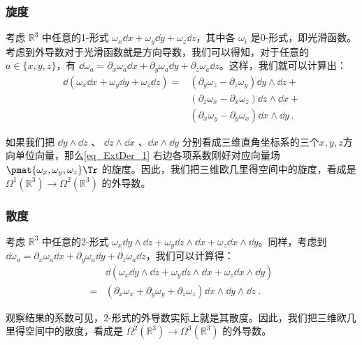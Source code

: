 \subsubsection{旋度}

考虑 $\mathbb{R}^3$ 中任意的1-形式 $\omega_x\dd x+\omega_y\dd y+\omega_z\dd z$，其中各 $\omega_i$ 是0-形式，即光滑函数。考虑到外导数对于光滑函数就是方向导数，我们可以得知，对于任意的 $a\in\{x,y,z\}$，有 $\dd\omega_a=\partial_x\omega_a\dd x+\partial_y\omega_a\dd y+\partial_z\omega_a\dd z$。这样，我们就可以计算出：
\begin{equation}\label{eq_ExtDer_1}
\begin{aligned}
\dd(\omega_x\dd x+\omega_y\dd y+\omega_z\dd z)={}&(\partial_y\omega_z-\partial_z\omega_y)\dd y\wedge\dd z+\\&(\partial_z\omega_x-\partial_x\omega_z)\dd z\wedge\dd x+\\&(\partial_x\omega_y-\partial_y\omega_x)\dd x\wedge\dd y~.
\end{aligned}
\end{equation}

如果我们把 $\dd y\wedge\dd z$ 、 $\dd z\wedge\dd x$ 、$\dd x\wedge\dd y$ 分别看成三维直角坐标系的三个$x, y, z$方向单位向量，那么\autoref{eq_ExtDer_1} 右边各项系数刚好对应向量场 $\pmat{\omega_x, \omega_y, \omega_z}\Tr$ 的旋度。因此，我们把三维欧几里得空间中的旋度，看成是 $\Omega^1(\mathbb{R}^3)\rightarrow\Omega^2(\mathbb{R}^3)$ 的外导数。

\subsubsection{散度}

考虑 $\mathbb{R}^3$ 中任意的2-形式 $\omega_x\dd y\wedge\dd z+\omega_y\dd z\wedge\dd x+\omega_z\dd x\wedge\dd y$。同样，考虑到 $\dd\omega_a=\partial_x\omega_a\dd x+\partial_y\omega_a\dd y+\partial_z\omega_a\dd z$，我们可以计算得：
\begin{equation}\label{eq_ExtDer_2}
\begin{aligned}
&\dd(\omega_x\dd y\wedge\dd z+\omega_y\dd z\wedge\dd x+\omega_z\dd x\wedge\dd y)\\={}&(\partial_x\omega_x+\partial_y\omega_y+\partial_z\omega_z)\dd x\wedge\dd y\wedge\dd z~.
\end{aligned}
\end{equation}

观察结果的系数可见，2-形式的外导数实际上就是其散度。因此，我们把三维欧几里得空间中的散度，看成是 $\Omega^2(\mathbb{R}^3)\rightarrow\Omega^3(\mathbb{R}^3)$ 的外导数。

